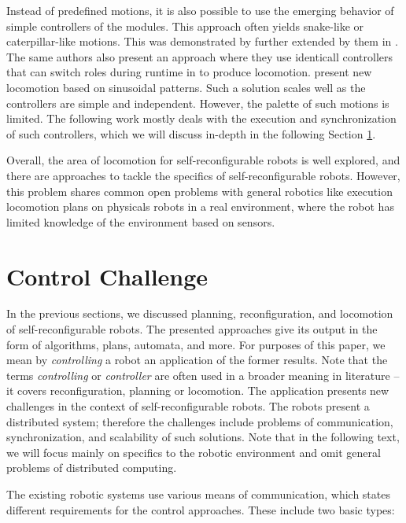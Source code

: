 Instead of predefined motions, it is also possible to use the emerging behavior
of simple controllers of the modules. This approach often yields snake-like or
caterpillar-like motions. This was demonstrated by \textcite{stoy2002global}
further extended by them in \cite{DBLP:conf/icra/StoySW03}. The same authors
also present an approach where they use identicall controllers that can switch
roles during runtime in \cite{1159219} to produce locomotion.
\textcite{gonzalez2006locomotion} present new locomotion based on sinusoidal
patterns. Such a solution scales well as the controllers are simple and
independent. However, the palette of such motions is limited. The following work
mostly deals with the execution and synchronization of such controllers, which
we will discuss in-depth in the following Section \ref{sec:chal-control}.

Overall, the area of locomotion for self-reconfigurable robots is well explored,
and there are approaches to tackle the specifics of self-reconfigurable robots.
However, this problem shares common open problems with general robotics like
execution locomotion plans on physicals robots in a real environment, where the
robot has limited knowledge of the environment based on sensors.

\section{Control Challenge}\label{sec:chal-control}

In the previous sections, we discussed planning, reconfiguration, and locomotion
of self-reconfigurable robots. The presented approaches give its output in the
form of algorithms, plans, automata, and more. For purposes of this paper, we
mean by \emph{controlling} a robot an application of the former results. Note
that the terms \emph{controlling} or \emph{controller} are often used in a
broader meaning in literature -- it covers reconfiguration, planning or
locomotion. The application presents new challenges in the context of
self-reconfigurable robots. The robots present a distributed system; therefore
the challenges include problems of communication, synchronization, and
scalability of such solutions. Note that in the following text, we will focus
mainly on specifics to the robotic environment and omit general problems of
distributed computing.

The existing robotic systems use various means of communication, which states
different requirements for the control approaches. These include two basic
types:

